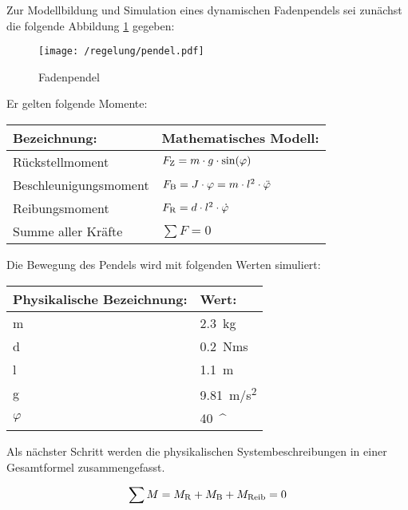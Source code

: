 Zur Modellbildung und Simulation eines dynamischen Fadenpendels sei zunächst die folgende Abbildung \ref{fig:pendel} gegeben:

\begin{figure}[h]
	\centering
	\texttt{[image: /regelung/pendel.pdf]}
	\label{fig:pendel}
	\caption{Fadenpendel}
\end{figure}

Er gelten folgende Momente:

\begin{center}
	\begin{tabular}{ll}
		\toprule
		Bezeichnung:				&	Mathematisches Modell: \\
		\midrule
		Rückstellmoment				&	$F_\i{Z} = m \cdot g \cdot \si{sin}(\varphi) \label{rueckstellmoment}$ \\
		Beschleunigungsmoment		&	$F_\i{B} = J \cdot \varphi = m \cdot l^{2} \cdot \ddot\varphi\label{beschleunigungsmoment} $ \\
		Reibungsmoment				&	$F_\i{R} = d \cdot l^{2} \cdot \dot\varphi\label{reibungsmoment} $ \\
		Summe aller Kräfte			&	$\sum F = 0 \label{momentengleichgewicht} $ \\
		\bottomrule 
	\end{tabular}
\end{center}

Die Bewegung des Pendels wird mit folgenden Werten simuliert:

\begin{center}
	\begin{tabular}{ll}
		\toprule
		Physikalische Bezeichnung:	& Wert: \\
		\midrule
		m		& \SI{2,3}{kg} \\
		d		& \SI{0,2}{Nms} \\
		l		& \SI{1,1}{m} \\
		g		& \SI{9,81}{m/s^2}\\
		$\varphi$ & \SI{40}{^\circ}\\
		\bottomrule
	\end{tabular}
\end{center}

Als nächster Schritt werden die physikalischen Systembeschreibungen in einer Gesamtformel zusammengefasst. 

\begin{align}
	\sum M = M_\i{R} + M_\i{B} + M_\i{Reib} = 0
	\label{momentengleichgewichtgesamt} 
\end{align}

